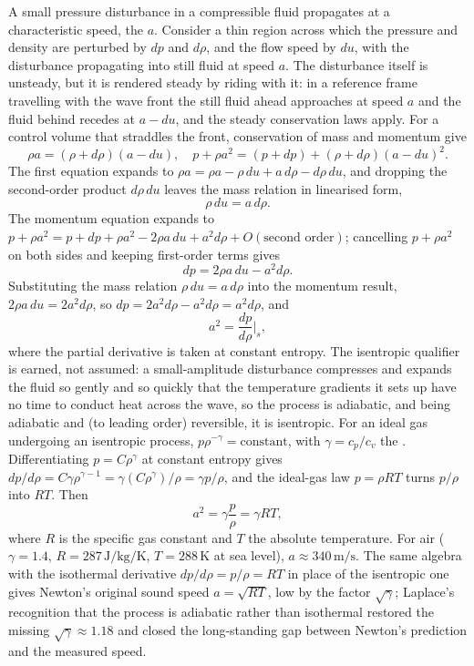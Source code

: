 A small pressure disturbance in a compressible fluid propagates at
a characteristic speed, the  $a$. Consider
a thin region across which the pressure and density are perturbed
by $dp$ and $d\rho$, and the flow speed by $du$, with the
disturbance propagating into still fluid at speed $a$. The
disturbance itself is unsteady, but it is rendered steady by riding
with it: in a reference frame travelling with the wave front the
still fluid ahead approaches at speed $a$ and the fluid behind
recedes at $a - du$, and the steady conservation laws apply. For a
control volume that straddles the front, conservation of mass and
momentum give
\[
\rho a = (\rho + d\rho)(a - du), \quad p + \rho a^2 = (p + dp)
+ (\rho + d\rho)(a - du)^2.
\]
The first equation expands to $\rho a = \rho a - \rho\,du
+ a\,d\rho - d\rho\,du$, and dropping the second-order product
$d\rho\,du$ leaves the mass relation in linearised form,
\[
\rho\,du = a\,d\rho.
\]
The momentum equation expands to $p + \rho a^2 = p + dp + \rho a^2
- 2\rho a\,du + a^2 d\rho + O(\text{second order})$; cancelling
$p + \rho a^2$ on both sides and keeping first-order terms gives
\[
dp = 2\rho a\,du - a^2 d\rho.
\]
Substituting the mass relation $\rho\,du = a\,d\rho$ into the
momentum result, $2\rho a\,du = 2a^2 d\rho$, so $dp = 2a^2 d\rho
- a^2 d\rho = a^2 d\rho$, and
\[
a^2 = \frac{dp}{d\rho}\bigg|_{s},
\]
where the partial derivative is taken at constant entropy. The
isentropic qualifier is earned, not assumed: a small-amplitude
disturbance compresses and expands the fluid so gently and so
quickly that the temperature gradients it sets up have no time to
conduct heat across the wave, so the process is adiabatic, and
being adiabatic and (to leading order) reversible, it is isentropic.
For an ideal gas undergoing an isentropic process, $p\rho^{-\gamma}
= \text{constant}$, with $\gamma = c_p/c_v$ the . Differentiating $p = C\rho^\gamma$ at constant
entropy gives $dp/d\rho = C\gamma\rho^{\gamma - 1} = \gamma
(C\rho^\gamma)/\rho = \gamma p/\rho$, and the ideal-gas law
$p = \rho R T$ turns $p/\rho$ into $RT$. Then
\[
a^2 = \gamma\frac{p}{\rho} = \gamma R T,
\]
where $R$ is the specific gas constant and $T$ the absolute
temperature. For air ($\gamma = 1.4$, $R = 287\,\si{\joule\per
\kilogram\per\kelvin}$, $T = 288\,\si{\kelvin}$ at sea level),
$a \approx 340\,\si{\meter\per\second}$. The same algebra with the
isothermal derivative $dp/d\rho = p/\rho = RT$ in place of the
isentropic one gives Newton's original sound speed $a =
\sqrt{RT}$, low by the factor $\sqrt{\gamma}$; Laplace's
recognition that the process is adiabatic rather than isothermal
restored the missing $\sqrt{\gamma}\approx 1.18$ and closed the
long-standing gap between Newton's prediction and the measured
speed.

